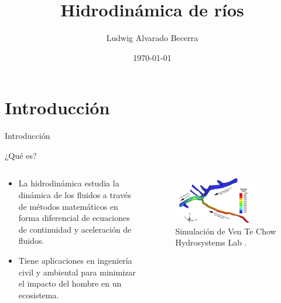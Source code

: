 \documentclass[17pt, t, lualatex]{beamer}
\title{Hidrodinámica de ríos}
\date{\today}
\institute[UJTL]{Universidad Jorge Tadeo Lozano}
\author{Ludwig Alvarado Becerra}
\begin{document}
\inserttitlepage

\section{Introducción}

\insertsectionpage

\begin{frame}{Introducción}
  \begin{block}{¿Qué es?}
  \end{block}

  \begin{columns}
    \begin{column}{.5\textwidth}
      \begin{itemize}
        \item La hidrodinámica estudia la dinámica de los fluidos a través de métodos matemáticos en forma diferencial de ecuaciones de continuidad y aceleración de fluidos.\cite{julien2018river}
        \item Tiene aplicaciones en ingeniería civil y ambiental para minimizar el impacto del hombre en un ecosistema. 
      \end{itemize}

      
    \end{column}

    \begin{column}{.5\textwidth}
      \begin{figure}[ht]
        \centering
        \includegraphics[width=0.8\textwidth]{img/1.jpg}
        \caption{\label{fig:1} Simulación de Ven Te Chow Hydrosystems Lab \parencite{ventechow2016river}.}
      \end{figure}

    \end{column}
  \end{columns}

\end{frame}
\end{document}

